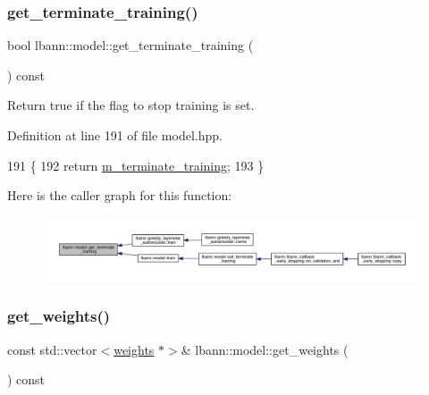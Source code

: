 \subsubsection{\texorpdfstring{get\+\_\+terminate\+\_\+training()}{get\_terminate\_training()}}
{\footnotesize\ttfamily bool lbann\+::model\+::get\+\_\+terminate\+\_\+training (\begin{DoxyParamCaption}{ }\end{DoxyParamCaption}) const\hspace{0.3cm}{\ttfamily [inline]}}

Return true if the flag to stop training is set. 

Definition at line 191 of file model.\+hpp.


\begin{DoxyCode}
191                                       \{
192     \textcolor{keywordflow}{return} \hyperlink{classlbann_1_1model_a639f9c3fcb81b905085f8b1932f8920f}{m\_terminate\_training};
193   \}
\end{DoxyCode}
Here is the caller graph for this function\+:\nopagebreak
\begin{figure}[H]
\begin{center}
\leavevmode
\includegraphics[width=350pt]{classlbann_1_1model_a90363b6a20269cf7197701e49f1f52a3_icgraph}
\end{center}
\end{figure}
\mbox{\label{classlbann_1_1model_ac0a89794f1f51e7c502fff2745c973e6}} 
\subsubsection{\texorpdfstring{get\+\_\+weights()}{get\_weights()}}
{\footnotesize\ttfamily const std\+::vector$<$\hyperlink{classlbann_1_1weights}{weights} $\ast$$>$\& lbann\+::model\+::get\+\_\+weights (\begin{DoxyParamCaption}{ }\end{DoxyParamCaption}) const\hspace{0.3cm}{\ttfamily [inline]}}

